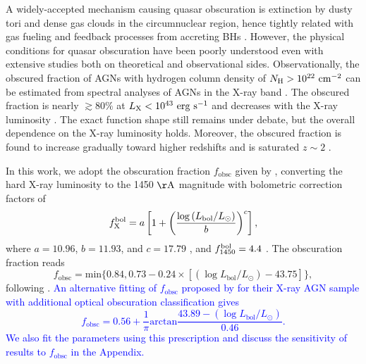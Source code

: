 \documentclass[twocolumn, twocolappendix]{aastex63}
\newcommand{\fobsc}{f_\mathrm{obsc}}
\newcommand{\Lbol}{L_\mathrm{bol}}
\newcommand{\red}[1]{\textcolor{red}{ #1}}
\newcommand{\blue}[1]{\textcolor{blue}{ #1}}
\begin{document}
\begin{CJK*}{UTF8}{gbsn}
A widely-accepted mechanism causing quasar obscuration is extinction by dusty tori and dense gas clouds 
in the circumnuclear region, hence tightly related with gas fueling and feedback processes from accreting BHs 
\citep[see][for a review]{2018ARA&A..56..625H}.
However, the physical conditions for quasar obscuration have been poorly understood even with extensive studies both on theoretical and observational sides. 
Observationally, the obscured fraction of AGNs with hydrogen column density of $N_{\rm H}>10^{22}~{\rm cm}^{-2}$
can be estimated from spectral analyses of AGNs in the X-ray band
\citep[e.g.,][]{2003ApJ...598..886U,2007A&A...463...79G,2008A&A...490..905H}. 
The obscured fraction is nearly $\gtrsim 80\%$ at $L_{\rm X}<10^{43}~{\rm erg~s}^{-1}$ and 
decreases with the X-ray luminosity \citep{2014ApJ...786..104U,2014MNRAS.437.3550M}.
The exact function shape still remains under debate, but the overall dependence on the X-ray luminosity holds.
Moreover, the obscured fraction is found to increase gradually toward higher redshifts and is saturated $z\sim 2$
\citep{2008A&A...490..905H,2014ApJ...786..104U,2014MNRAS.437.3550M,2018MNRAS.473.2378V}.


In this work, we adopt the obscuration fraction $\fobsc$ given by \citet{2014ApJ...786..104U}, 
converting the hard X-ray luminosity to the 1450 $\mathrm{\AA}$ magnitude with bolometric correction factors of
\begin{equation*}
  f^{\rm bol}_{\rm X} =
  a\left[1+\left(\frac{\log \left(\Lbol / L_\odot\right)}{b}\right)^{c}\right],
\end{equation*}
where $a=10.96$, $b = 11.93$, and $c = 17.79$ \citep[Eq. 2 in ][]{2020A&A...636A..73D}, 
and $f^{\rm bol}_{1450}=4.4$ \citep{2006ApJS..166..470R}.
The obscuration fraction reads 
\begin{equation*}
  \fobsc = \text{min}\lbrace  0.84 , 0.73-0.24\times[ (\log \Lbol/L_\odot) -43.75] \rbrace,
\end{equation*}
following \citet{2014ApJ...786..104U}.
\blue{
An alternative fitting of $\fobsc$ proposed by \citet{2014MNRAS.437.3550M} 
for their X-ray AGN sample with additional optical obscuration classification gives 
\begin{equation*}
  \fobsc = 0.56 + \frac{1}{\pi} \text{arctan} \frac{43.89 - (\log \Lbol/L_\odot)}{0.46}.
\end{equation*}
We also fit the parameters using this prescription and discuss the sensitivity of results to $\fobsc$ in the Appendix.
}


\end{CJK*}
\end{document}
